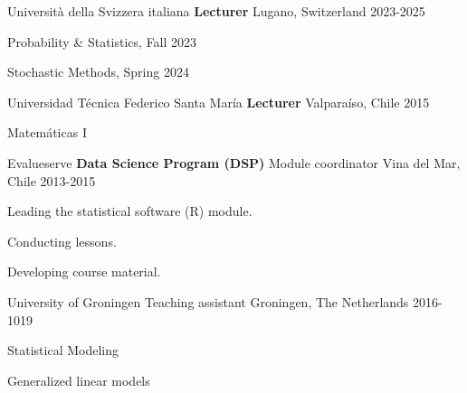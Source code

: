 


\begin{cventries}

  \cventry
    {Università della Svizzera italiana} %
    {{\bf Lecturer} } %
    {Lugano, Switzerland} %
    {2023-2025} %
    {
      \begin{cvitems} %
        \item {Probability \& Statistics, Fall 2023}
        \item {Stochastic Methods, Spring 2024}
      \end{cvitems}
    }
  \cventry
    {Universidad T\'ecnica Federico Santa Mar\'ia} %
    {{\bf Lecturer} } %
    {Valpara\'iso, Chile} %
    {2015} %
    {
      \begin{cvitems} %
        \item {Matem\'aticas I}
      \end{cvitems}
    }


  \cventry
    {Evalueserve} %
    {{\bf Data Science Program (DSP)} Module coordinator} %
    {Vina del Mar, Chile} %
    {2013-2015} %
    {
      \begin{cvitems} %
        	\item Leading the statistical software (R) module.
			\item Conducting lessons.
			\item Developing course material.  
      \end{cvitems}
    }

  \cventry
    {University of Groningen} %
    {Teaching assistant} %
    {Groningen, The Netherlands} %
    {2016-1019} %
    {
      \begin{cvitems} %
        \item {Statistical Modeling}
        \item {Generalized linear models}
      \end{cvitems}
    }


\end{cventries}
